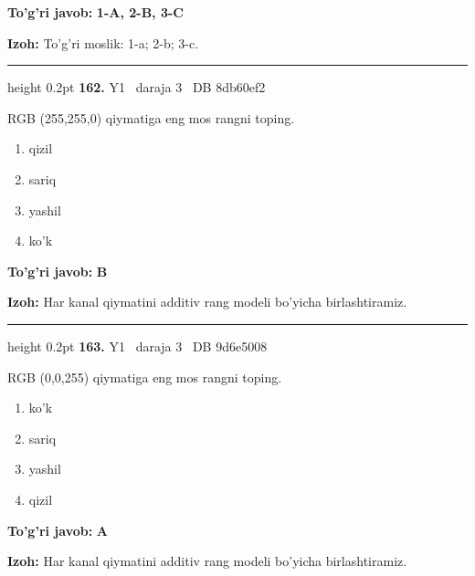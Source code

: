\documentclass[10pt,a4paper,oneside]{article}
\begin{document}
\begin{tcolorbox}[enhanced,breakable,colback=teal!4,colframe=teal!45!black,boxrule=0.45pt,arc=1.2mm,left=2.8mm,right=2.8mm,top=2mm,bottom=2mm,before skip=2mm,after skip=2mm]
\textbf{\color{teal}To'g'ri javob:} \textbf{1-A, 2-B, 3-C}
\par\smallskip
\textbf{Izoh:} To'g'ri moslik: 1-a; 2-b; 3-c.
\end{tcolorbox}
\vspace{2mm}\hrule height 0.2pt \vspace{4mm}
\hypertarget{q162}{\textbf{\color{ink}162.}}  {\color{muted}\scriptsize Y1 \textbullet\ daraja 3 \textbullet\ DB 8db60ef2}
\par
RGB (255,255,0) qiymatiga eng mos rangni toping.
\begin{enumerate}[label=\Alph*),leftmargin=9mm]
\item qizil
\item sariq
\item yashil
\item ko'k
\end{enumerate}
\begin{tcolorbox}[enhanced,breakable,colback=teal!4,colframe=teal!45!black,boxrule=0.45pt,arc=1.2mm,left=2.8mm,right=2.8mm,top=2mm,bottom=2mm,before skip=2mm,after skip=2mm]
\textbf{\color{teal}To'g'ri javob:} \textbf{B}
\par\smallskip
\textbf{Izoh:} Har kanal qiymatini additiv rang modeli bo'yicha birlashtiramiz.
\end{tcolorbox}
\vspace{2mm}\hrule height 0.2pt \vspace{4mm}
\hypertarget{q163}{\textbf{\color{ink}163.}}  {\color{muted}\scriptsize Y1 \textbullet\ daraja 3 \textbullet\ DB 9d6e5008}
\par
RGB (0,0,255) qiymatiga eng mos rangni toping.
\begin{enumerate}[label=\Alph*),leftmargin=9mm]
\item ko'k
\item sariq
\item yashil
\item qizil
\end{enumerate}
\begin{tcolorbox}[enhanced,breakable,colback=teal!4,colframe=teal!45!black,boxrule=0.45pt,arc=1.2mm,left=2.8mm,right=2.8mm,top=2mm,bottom=2mm,before skip=2mm,after skip=2mm]
\textbf{\color{teal}To'g'ri javob:} \textbf{A}
\par\smallskip
\textbf{Izoh:} Har kanal qiymatini additiv rang modeli bo'yicha birlashtiramiz.
\end{tcolorbox}
\end{document}
